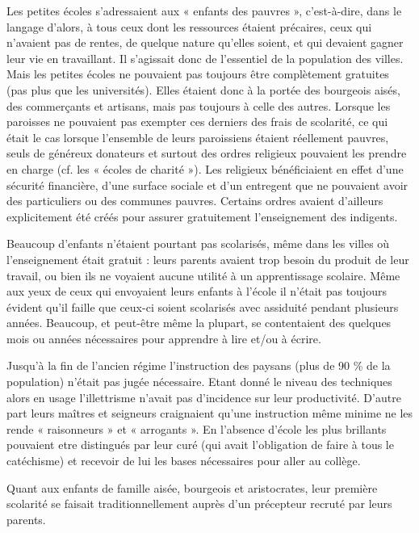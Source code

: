  Les petites écoles s'adressaient aux « enfants des pauvres », c'est-à-dire, dans le langage d'alors, à tous ceux dont les ressources étaient précaires, ceux qui n'avaient pas de rentes, de quelque nature qu'elles soient, et qui devaient gagner leur vie en travaillant. Il s'agissait donc de l'essentiel de la population des villes. Mais les petites écoles ne pouvaient pas toujours être complètement gratuites (pas plus que les universités). Elles étaient donc à la portée des bourgeois aisés, des commerçants et artisans, mais pas toujours à celle des autres. Lorsque les paroisses ne pouvaient pas exempter ces derniers des frais de scolarité, ce qui était le cas lorsque l'ensemble de leurs paroissiens étaient réellement pauvres, seuls de généreux donateurs et surtout des ordres religieux pouvaient les prendre en charge (cf.  les « écoles de charité »). Les religieux bénéficiaient en effet d'une sécurité financière, d'une surface sociale et d'un entregent que ne pouvaient avoir des particuliers ou des communes pauvres. Certains ordres avaient d'ailleurs explicitement été créés pour assurer gratuitement l'enseignement des indigents.

Beaucoup d'enfants n'étaient pourtant pas scolarisés, même dans les villes où l'enseignement était gratuit : leurs parents avaient trop besoin du produit de leur travail, ou bien ils ne voyaient aucune utilité à un apprentissage scolaire. Même aux yeux de ceux qui envoyaient leurs enfants à l'école il n'était pas toujours évident qu'il faille que ceux-ci soient scolarisés avec assiduité pendant plusieurs années. Beaucoup, et peut-être même la plupart, se contentaient des quelques mois ou années nécessaires pour apprendre à lire et/ou à écrire. 



 Jusqu'à la fin de l'ancien régime l'instruction des paysans (plus de 90 \% de la population) n'était pas jugée nécessaire. Etant donné le niveau des techniques alors en usage l'illettrisme n'avait pas d'incidence sur leur productivité. D'autre part leurs maîtres et seigneurs craignaient qu'une instruction même minime ne les rende « raisonneurs » et « arrogants ». En l'absence d'école les plus brillants pouvaient etre distingués par leur curé (qui avait l'obligation de faire à tous le catéchisme) et recevoir de lui les bases nécessaires pour aller au collège.

Quant aux enfants de famille aisée, bourgeois et aristocrates, leur première scolarité se faisait traditionnellement auprès d'un précepteur recruté par leurs parents.  


